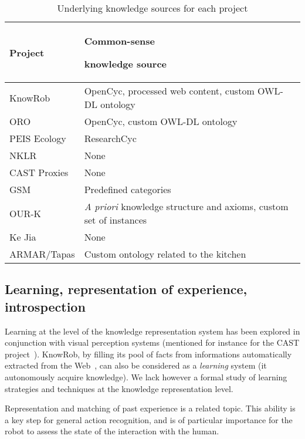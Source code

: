 \documentclass[journal]{IEEEtran}
\begin{document}
\begin{table}
\begin{center}

\begin{tabular}{lp{4cm}}
\toprule
{\bf Project} & {\bf Common-sense \par knowledge source} \\
\midrule
{\sc KnowRob} & {\sc OpenCyc}, processed web content, custom OWL-DL ontology \\
ORO & {\sc OpenCyc}, custom OWL-DL ontology \\
PEIS Ecology & {\sc ResearchCyc} \\
NKLR &  None \\
CAST Proxies &  None \\
GSM &  Predefined categories \\
OUR-K & {\it A priori} knowledge structure and axioms, custom set of instances\\
Ke Jia & None \\
ARMAR/{\sc Tapas} & Custom ontology related to the kitchen\\

\bottomrule

\end{tabular}
\end{center}
\caption{Underlying knowledge sources for each project}
\label{table|knowledge-sources}
\end{table}

\subsection{Learning, representation of experience, introspection}

Learning at the level of the knowledge representation system has been explored
in conjunction with visual perception systems (mentioned for instance for the
CAST project~\cite{jacobsson2008crossmodal}). {\sc KnowRob}, by filling its pool of
facts from informations automatically extracted from the Web~\cite{Nyga2009},
can also be considered as a \emph{learning} system (it autonomously acquire
knowledge). We lack however a formal study of learning strategies and
techniques at the knowledge representation level.

Representation and matching of past experience is a related topic. This ability
is a key step for general action recognition, and is of particular importance
for the robot to assess the state of the interaction with the human.
\end{document}
